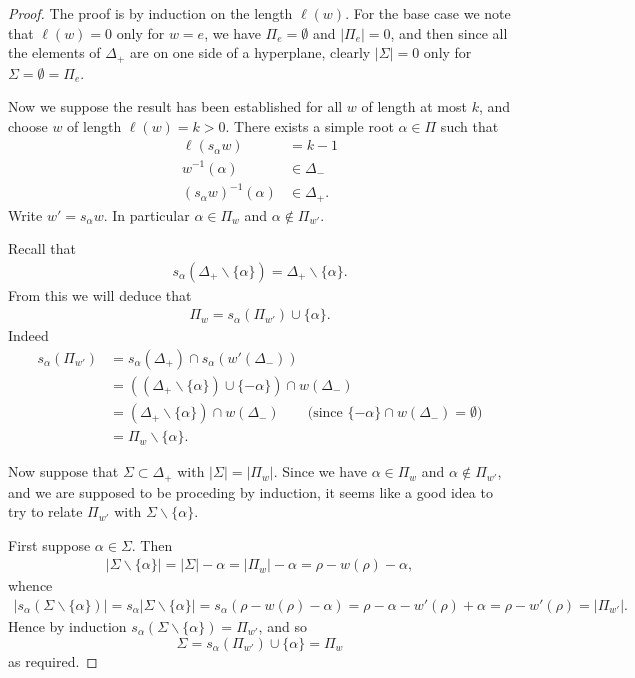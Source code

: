 \documentclass[12pt]{article}
\theoremstyle{plain}
\theoremstyle{definition}
\numberwithin{equation}{section}
\newcommand{\al}{\alpha}
\newcommand{\D}{\Delta}
\begin{document}
\begin{proof}
The proof is by induction on the length $\ell(w)$. For the base case we note that $\ell(w) = 0$ only for $w=e$, we have $\Pi_e = \emptyset$ and $|\Pi_e| = 0$, and then since all the elements of $\D_+$ are on one side of a hyperplane, clearly $|\Sigma| = 0$ only for $\Sigma = \emptyset = \Pi_e$.

Now we suppose the result has been established for all $w$ of length at most $k$, and choose $w$ of length $\ell(w) = k > 0$. There exists a simple root $\al \in \Pi$ such that
\begin{align*}
\ell(s_\al w) &= k-1 \\
%
w^{-1}(\al) &\in \D_- \\
%
(s_\al w)^{-1}(\al) &\in \D_+.
\end{align*}
Write $w' = s_\al w$. In particular $\al \in \Pi_w$ and $\al \notin \Pi_{w'}$.

Recall that
\begin{align*}
s_\al(\D_+ \backslash \{\al\}) = \D_+ \backslash \{\al\}.
\end{align*}
From this we will deduce that
\begin{align*}
\Pi_w = s_{\al}(\Pi_{w'}) \cup \{\al\}.
\end{align*}
Indeed
\begin{align*}
s_{\al}(\Pi_{w'}) &= s_{\al}(\Delta_+) \cap s_{\al}(w'(\Delta_-)) \\
%
&= ((\Delta_+ \backslash \{\al\}) \cup \{-\al\}) \cap w(\Delta_-) \\
%
&= (\Delta_+ \backslash \{\al\}) \cap w(\Delta_-) \qquad \text{(since $\{-\al\} \cap w(\Delta_-) = \emptyset$)} \\
%
&= \Pi_w \backslash \{\al\}.
\end{align*}


Now suppose that $\Sigma \subset \D_+$ with $|\Sigma| = |\Pi_w|$. Since we have $\al \in \Pi_w$ and $\al \notin \Pi_{w'}$, and we are supposed to be proceding by induction, it seems like a good idea to try to relate $\Pi_{w'}$ with $\Sigma \backslash \{\al\}$.

First suppose $\al \in \Sigma$. Then
\begin{align*}
|\Sigma \backslash \{\al\}| = |\Sigma| - \al = |\Pi_w| - \al = \rho - w(\rho) - \al,
\end{align*}
whence
\begin{align*}
|s_\al(\Sigma \backslash \{\al\})| = s_\al|\Sigma \backslash \{\al\}| = s_\al(\rho - w(\rho) - \al) = \rho - \al - w'(\rho) + \al = \rho - w'(\rho) = |\Pi_{w'}|.
\end{align*}
Hence by induction $s_\al(\Sigma \backslash \{\al\}) = \Pi_{w'}$, and so
\[
\Sigma = s_{\al}(\Pi_{w'}) \cup \{\al\} = \Pi_w
\]
as required.



\end{proof}
\end{document}
